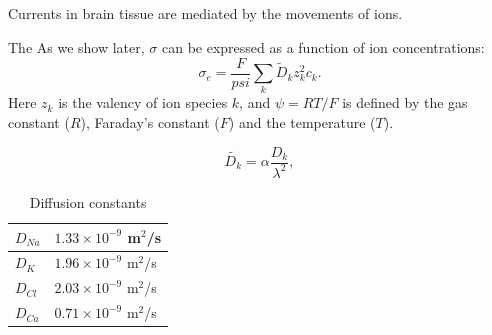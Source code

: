 \subsection{ }
Currents in brain tissue are mediated by the movements of ions. 

The 
As we show later, $\sigma$ can be expressed as a function of ion concentrations:
\begin{equation}
\sigma_e = \frac{F}{psi}\sum_{k} \tilde{D}_k z_{k}^2 c_{k}.
\label{eq:sigma1}
\end{equation}
Here $z_{k}$ is the valency of ion species $k$, and $\psi=RT/F$ is defined by the gas constant ($R$), Faraday's constant ($F$) and the temperature ($T$).

\begin{equation}
\tilde{D_k} = \alpha \frac{D_k}{\lambda^2}, 
\label{eq:diffconst}
\end{equation}

\begin{table}[h!]
\begin{center}
\caption{Diffusion constants}
\label{tab:diffconsts}
    \begin{tabular}{l|l}
    \hline
    $D_{Na}$ & $1.33\times 10^{-9}$ m$^2$/s\\ \hline
    $D_K$ & $1.96  \times 10^{-9}$ m$^2$/s \\ \hline
    $D_{Cl}$ & $2.03 \times 10^{-9}$ m$^2$/s \\ \hline
    $D_{Ca}$ & $0.71\times 10^{-9}$ m$^2$/s \\ \hline
    \end{tabular}
\end{center}
\end{table}


